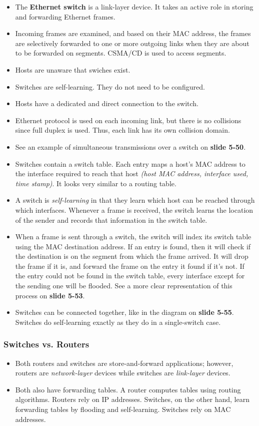 \documentclass{article}
\begin{document}
\begin{itemize}
\item The {\bf Ethernet switch} is a link-layer device. It takes an active role in storing and forwarding Ethernet frames.
\item Incoming frames are examined, and based on their MAC address, the frames are selectively forwarded to one or more outgoing links when they are about to be forwarded on segments. CSMA/CD is used to access segments.
\item Hosts are unaware that swiches exist.
\item Switches are self-learning. They do not need to be configured.
\item Hosts have a dedicated and direct connection to the switch.
\item Ethernet protocol is used on each incoming link, but there is no collisions since full duplex is used. Thus, each link has its own collision domain.
\item See an example of simultaneous transmissions over a switch on {\bf slide 5-50}.
\item Switches contain a switch table. Each entry maps a host's MAC address to the interface required to reach that host \emph{(host MAC address, interface used, time stamp)}. It looks very similar to a routing table.
\item A switch is \emph{self-learning} in that they learn which host can be reached through which interfaces. Whenever a frame is received, the switch learns the location of the sender and records that information in the switch table.
\item When a frame is sent through a switch, the switch will index its switch table using the MAC destination address. If an entry is found, then it will check if the destination is on the segment from which the frame arrived. It will drop the frame if it is, and forward the frame on the entry it found if it's not. If the entry could not be found in the switch table, every interface except for the sending one will be flooded. See a more clear representation of this process on {\bf slide 5-53}.
\item Switches can be connected together, like in the diagram on {\bf slide 5-55}. Switches do self-learning exactly as they do in a single-switch case.
\end{itemize}

\subsubsection{Switches vs. Routers}
\begin{itemize}
\item Both routers and switches are store-and-forward applications; however, routers are \emph{network-layer} devices while switches are \emph{link-layer} devices.
\item Both also have forwarding tables. A router computes tables using routing algorithms. Routers rely on IP addresses. Switches, on the other hand, learn forwarding tables by flooding and self-learning. Switches rely on MAC addresses.
\end{itemize}
\end{document}

